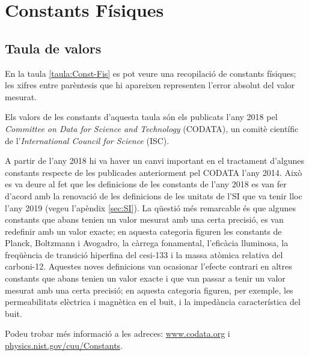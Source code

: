 \chapter{Constants Físiques}\label{sec:const_fis} 

\section{Taula de valors}

En la taula \vref{taula:Const-Fis} es pot veure una recopilació de
constants físiques; les xifres entre parèntesis que hi apareixen representen l'error absolut del valor mesurat.

Els valors de les constants d'aquesta taula són els publicats
l'any 2018 pel \textit{Committee on Data for Science and Technology}
(CODATA), un comitè científic de l'\textit{International Council
for Science} (ISC).

A partir de l'any 2018 hi va haver un canvi important en el tractament d'algunes constants respecte de les publicades anteriorment pel CODATA l'any 2014. Això es va deure al fet que les definicions de les constants de l'any 2018 es van fer d'acord amb la renovació de les definicions de les unitats de l'SI que va tenir lloc l'any 2019 (vegeu l'apèndix \ref{sec:SI}). La qüestió més remarcable és que algunes constants que abans tenien un valor mesurat amb una certa precisió, es van redefinir amb un valor exacte; en aquesta categoria figuren les constants de Planck, Boltzmann i Avogadro, la càrrega fonamental, l'eficàcia lluminosa, la freqüència de transició hiperfina del cesi-133 i la massa atòmica relativa del carboni-12. Aquestes noves definicions van ocasionar l'efecte contrari en altres constants que abans tenien un valor exacte i que van passar a tenir un valor mesurat amb una certa precisió; en aquesta categoria figuren, per exemple, les permeabilitats elèctrica i magnètica en el buit, i la impedància característica del buit.

Podeu trobar  més informació a
les adreces: \href{http://www.codata.org/}{www.codata.org} i \href{http://physics.nist.gov/cuu/Constants/}{physics.nist.gov/cuu/Constants}.

